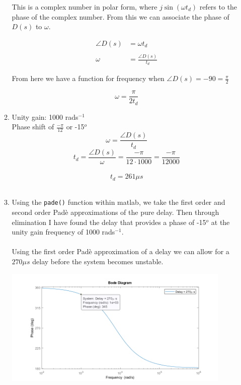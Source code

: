 \documentclass[a4paper,11pt]{article}
\newcommand{\code}[1]{\colorbox{codegray}{\texttt{#1}}}
\begin{document}
\begin{preview}
\begin{enumerate}
\begin{enumerate}
  This is a complex number in polar form, where $j \sin(\omega t_d)$ refers to the phase of the complex number. From this we can associate the phase of $D(s)$ to $\omega$.

  \begin{align*}
    \angle D(s) &= \omega t_d\\\\
    \omega &= \frac{\angle D(s)}{t_d}
  \end{align*}

  From here we have a function for frequency when $\angle D(s) = -90 = \frac{\pi}{2}$

  $$ \omega = \frac{\pi}{2 t_d} $$

  \item 

  Unity gain: 1000 rads$^{-1}$\\
  Phase shift of $\frac{-\pi}{12}$ or -15$^o$\\
  $$ \omega = \frac{\angle D(s)}{t_d}$$ 
  $$ t_d = \frac{\angle D(s)}{\omega} = \frac{-\pi}{12\cdot1000} = \frac{-\pi}{12000}$$\\
  $$ t_d = 261 \mu s$$\\

  \item 

  Using the \code{pade()} function within matlab, we take the first order and second order Pad\`{e} approximations of the pure delay. Then through elimination I have found the delay that provides a phase of -15$^o$ at the unity gain frequency of 1000 rads$^{-1}$.\\\\

  Using the first order Pad\`{e} approximation of a delay we can allow for a $270 \mu s$ delay before the system becomes unstable.
  \begin{center}
    \includegraphics[width=0.9\textwidth]{Summative/first_order_pade.png}
  \end{center}


\end{enumerate}
\end{enumerate}
\end{preview}
\end{document}

